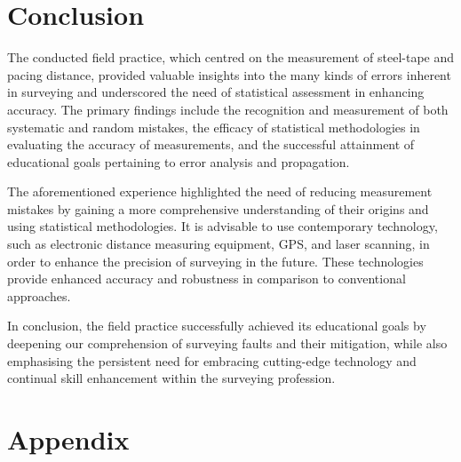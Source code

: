 \documentclass[12pt]{article}
\begin{document}
\section*{Conclusion}

The conducted field practice, which centred on the measurement of steel-tape and pacing distance, provided valuable insights into the many kinds of errors inherent in surveying and underscored the need of statistical assessment in enhancing accuracy. The primary findings include the recognition and measurement of both systematic and random mistakes, the efficacy of statistical methodologies in evaluating the accuracy of measurements, and the successful attainment of educational goals pertaining to error analysis and propagation.

The aforementioned experience highlighted the need of reducing measurement mistakes by gaining a more comprehensive understanding of their origins and using statistical methodologies. It is advisable to use contemporary technology, such as electronic distance measuring equipment, GPS, and laser scanning, in order to enhance the precision of surveying in the future. These technologies provide enhanced accuracy and robustness in comparison to conventional approaches.

In conclusion, the field practice successfully achieved its educational goals by deepening our comprehension of surveying faults and their mitigation, while also emphasising the persistent need for embracing cutting-edge technology and continual skill enhancement within the surveying profession.



\newpage
\section*{Appendix}
\end{document}
